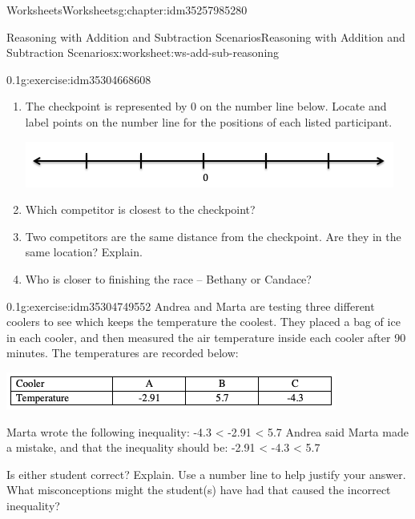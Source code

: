 \documentclass[twoside,11pt,]{book}
\begin{document}
\begin{chapterptx}{Worksheets}{}{Worksheets}{}{}{g:chapter:idm35257985280}
\begin{worksheet-section-numberless}{Reasoning with Addition and Subtraction Scenarios}{}{Reasoning with Addition and Subtraction Scenarios}{}{}{x:worksheet:ws-add-sub-reasoning}
\begin{divisionexercise}{5}{}{0.1}{g:exercise:idm35304668608}
\begin{sidebyside}{1}{0.05}{0.05}{0}
\begin{sbspanel}{0.9}
\end{sbspanel}%
\end{sidebyside}%
%
\begin{enumerate}[label=(\alph*)]
\item{}The checkpoint is represented by 0 on the number line below.  Locate and label points on the number line for the positions of each listed participant. \begin{sidebyside}{1}{0.05}{0.05}{0}%
\begin{sbspanel}{0.9}%
\includegraphics[width=1\linewidth]{images/blank-number-line.png}
\end{sbspanel}%
\end{sidebyside}%
%
\item{}Which competitor is closest to the checkpoint?%
\item{}Two competitors are the same distance from the checkpoint.  Are they in the same location?  Explain.%
\item{}Who is closer to finishing the race – Bethany or Candace?%
\end{enumerate}
\end{divisionexercise}%
\clearpage
\begin{divisionexercise}{6}{}{0.1}{g:exercise:idm35304749552}%
Andrea and Marta are testing three different coolers to see which keeps the temperature the coolest.  They placed a bag of ice in each cooler, and then measured the air temperature inside each cooler after 90 minutes.  The temperatures are recorded below:%
\begin{image}{0}{1}{0}%
\includegraphics[width=1\linewidth]{images/reasoning-table-cooler.png}
\end{image}%
Marta wrote the following inequality: -4.3 \textless{}  -2.91 \textless{} 5.7 Andrea said Marta made a mistake, and that the inequality should be: -2.91 \textless{} -4.3 \textless{} 5.7%
\par
Is either student correct?  Explain.  Use a number line to help justify your answer.  What misconceptions might the student(s) have had that caused the incorrect inequality?%
\end{divisionexercise}%

\end{worksheet-section-numberless}
\end{chapterptx}
\end{document}
